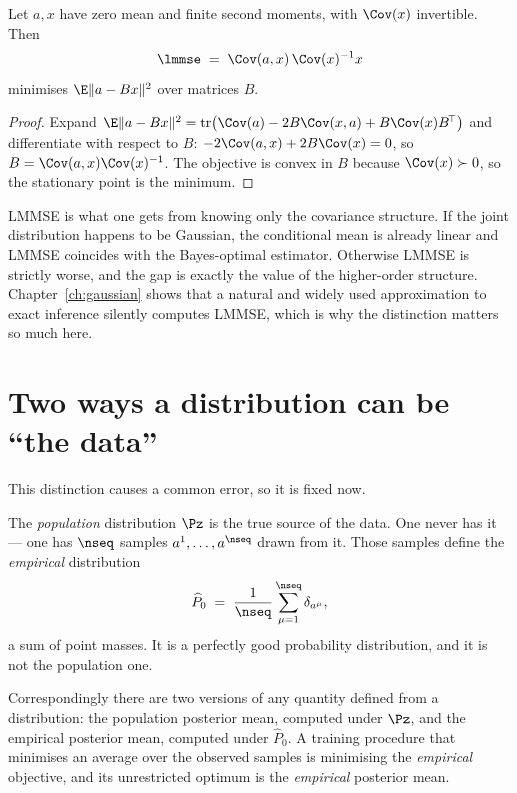 \begin{proposition}
\label{prop:lmmse-general}
Let $a, x$ have zero mean and finite second moments, with $\Cov(x)$ invertible. Then
\begin{equation}
\label{eq:lmmse-general}
\lmmse \;=\; \Cov(a,x)\,\Cov(x)^{-1} x
\end{equation}
minimises $\E\|a - Bx\|^2$ over matrices $B$.
\end{proposition}

\begin{proof}
Expand $\E\|a-Bx\|^2 = \operatorname{tr}\!\big(\Cov(a) - 2B\Cov(x,a) + B\Cov(x)B^{\!\top}\big)$
and differentiate with respect to $B$:
$-2\Cov(a,x) + 2B\Cov(x) = 0$, so $B = \Cov(a,x)\Cov(x)^{-1}$. The objective is convex in $B$
because $\Cov(x)\succ0$, so the stationary point is the minimum.
\end{proof}

\begin{intuition}
LMMSE is what one gets from knowing only the covariance structure. If the joint distribution
happens to be Gaussian, the conditional mean is already linear and LMMSE coincides with the
Bayes-optimal estimator. Otherwise LMMSE is strictly worse, and the gap is exactly the value
of the higher-order structure. Chapter~\ref{ch:gaussian} shows that a natural and widely used
approximation to exact inference silently computes LMMSE, which is why the distinction
matters so much here.
\end{intuition}

\section{Two ways a distribution can be ``the data''}
\label{sec:empirical}

This distinction causes a common error, so it is fixed now.

The \emph{population} distribution $\Pz$ is the true source of the data. One never has it ---
one has $\nseq$ samples $a^1,\dots,a^{\nseq}$ drawn from it. Those samples define the
\emph{empirical} distribution
\begin{equation}
\label{eq:empirical}
\widehat{P}_0 \;=\; \frac{1}{\nseq}\sum_{\mu=1}^{\nseq} \delta_{a^\mu},
\end{equation}
a sum of point masses. It is a perfectly good probability distribution, and it is not the
population one.

Correspondingly there are two versions of any quantity defined from a distribution: the
population posterior mean, computed under $\Pz$, and the empirical posterior mean, computed
under $\widehat{P}_0$. A training procedure that minimises an average over the observed
samples is minimising the \emph{empirical} objective, and its unrestricted optimum is the
\emph{empirical} posterior mean.

